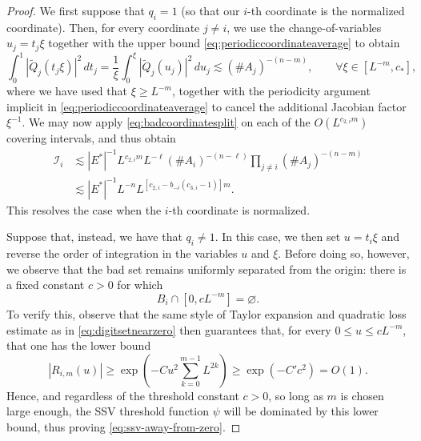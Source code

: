\documentclass[12pt]{amsart}
\numberwithin{equation}{section}
\begin{document}
\begin{proof}
We first suppose that $q_i = 1$ (so that our $i$-th coordinate is the normalized coordinate).  Then, for every coordinate $j \neq i$, we use the change-of-variables $u_j=t_j\xi$ together with the upper bound \eqref{eq:periodiccoordinateaverage} to obtain
\[
 \int_0^1|\widetilde Q_j(t_j\xi)|^2\,dt_j
 =\frac1\xi\int_0^\xi|\widetilde Q_j(u_j)|^2\,du_j
 \lesssim(\#A_j)^{-(n-m)}, \qquad \forall \xi \in [L^{-m}, c_*],
\]
where we have used that $\xi \geq L^{-m}$, together with the periodicity argument implicit in \eqref{eq:periodiccoordinateaverage} to cancel the additional Jacobian factor $\xi^{-1}$.  We may now apply \eqref{eq:badcoordinatesplit} on each of the $O(L^{c_{2,i}m})$ covering intervals, and thus obtain
\begin{align*}
 \mathcal I_i
 &\lesssim |E^*|^{-1}L^{c_{2,i}m}L^{-\ell}
 (\#A_i)^{-(n-\ell)}
 \prod_{j\ne i}(\#A_j)^{-(n-m)}\\
 &\lesssim |E^*|^{-1}L^{-n}
 L^{[c_{2,i}-b_{-i}(c_{3,i}-1)]m}.
\end{align*}
This resolves the case when the $i$-th coordinate is normalized.

Suppose that, instead, we have that $q_i \neq 1$.  In this case, we then set $u=t_i\xi$ and reverse the order of integration in the variables $u$ and $\xi$. Before doing so, however, we observe that the bad set remains uniformly separated from the origin: there is a fixed constant $c>0$ for which
\begin{equation}\label{eq:ssv-away-from-zero}
 B_i\cap[0,cL^{-m}]=\varnothing.
\end{equation}
To verify this, observe that the same style of Taylor expansion and quadratic loss estimate as in \eqref{eq:digitsetnearzero}
then guarantees that, for every  $0\leq u\leq cL^{-m}$, that one has the lower bound
\[
 |R_{i,m}(u)|
 \geq\exp\left(-Cu^2\sum_{k=0}^{m-1}L^{2k}\right)
 \geq\exp(-C'c^2) = O(1).
\]
Hence, and regardless of the threshold constant $c > 0$, so long as $m$ is chosen large enough, the SSV threshold function $\psi$ will be dominated by this lower bound, thus proving \eqref{eq:ssv-away-from-zero}.


\end{proof}
\end{document}
